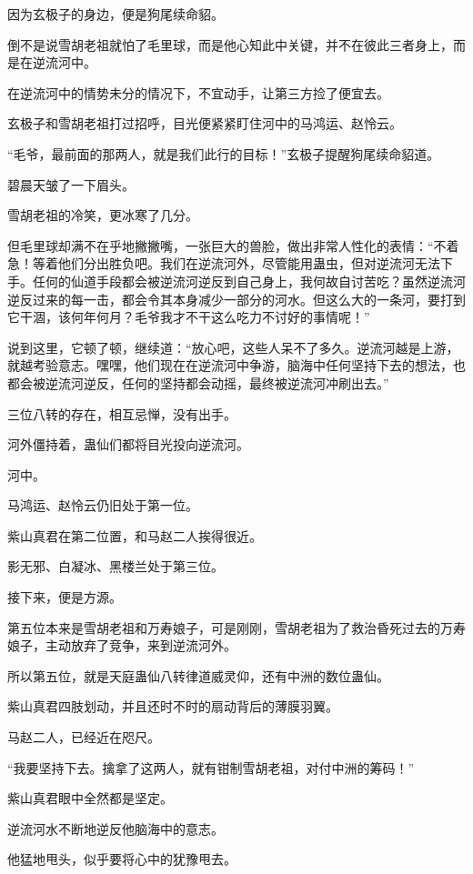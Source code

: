 \begin{this_body}
因为玄极子的身边，便是狗尾续命貂。

倒不是说雪胡老祖就怕了毛里球，而是他心知此中关键，并不在彼此三者身上，而是在逆流河中。

在逆流河中的情势未分的情况下，不宜动手，让第三方捡了便宜去。

玄极子和雪胡老祖打过招呼，目光便紧紧盯住河中的马鸿运、赵怜云。

“毛爷，最前面的那两人，就是我们此行的目标！”玄极子提醒狗尾续命貂道。

碧晨天皱了一下眉头。

雪胡老祖的冷笑，更冰寒了几分。

但毛里球却满不在乎地撇撇嘴，一张巨大的兽脸，做出非常人性化的表情：“不着急！等着他们分出胜负吧。我们在逆流河外，尽管能用蛊虫，但对逆流河无法下手。任何的仙道手段都会被逆流河逆反到自己身上，我何故自讨苦吃？虽然逆流河逆反过来的每一击，都会令其本身减少一部分的河水。但这么大的一条河，要打到它干涸，该何年何月？毛爷我才不干这么吃力不讨好的事情呢！”

说到这里，它顿了顿，继续道：“放心吧，这些人呆不了多久。逆流河越是上游，就越考验意志。嘿嘿，他们现在在逆流河中争游，脑海中任何坚持下去的想法，也都会被逆流河逆反，任何的坚持都会动摇，最终被逆流河冲刷出去。”

三位八转的存在，相互忌惮，没有出手。

河外僵持着，蛊仙们都将目光投向逆流河。

河中。

马鸿运、赵怜云仍旧处于第一位。

紫山真君在第二位置，和马赵二人挨得很近。

影无邪、白凝冰、黑楼兰处于第三位。

接下来，便是方源。

第五位本来是雪胡老祖和万寿娘子，可是刚刚，雪胡老祖为了救治昏死过去的万寿娘子，主动放弃了竞争，来到逆流河外。

所以第五位，就是天庭蛊仙八转律道威灵仰，还有中洲的数位蛊仙。

紫山真君四肢划动，并且还时不时的扇动背后的薄膜羽翼。

马赵二人，已经近在咫尺。

“我要坚持下去。擒拿了这两人，就有钳制雪胡老祖，对付中洲的筹码！”

紫山真君眼中全然都是坚定。

逆流河水不断地逆反他脑海中的意志。

他猛地甩头，似乎要将心中的犹豫甩去。


\end{this_body}
